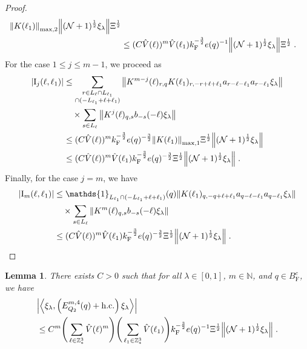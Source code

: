 \documentclass[12pt,a4paper]{article}
\numberwithin{equation}{section}
\newcommand{\NNN}{\mathbb{N}}
\newcommand{\1}{\mathbb{I}}
\newcommand{\F}{\mathrm{F}}
\newcommand{\I}{\mathrm{I}}
\newcommand{\Z}{\mathbb{Z}}
\newcommand{\NN}{\mathcal{N}}
\newcommand{\half}{\frac{1}{2}}
\newcommand{\eva}[1]{\left\langle #1 \right\rangle}
\theoremstyle{plain}
\newtheorem{lemma}[theorem]{Lemma}
\theoremstyle{definition}
\theoremstyle{remark}
\theoremstyle{plain}
\theoremstyle{definition}
\theoremstyle{remark}
\begin{document}
\begin{proof}
\begin{align}
		\norm{K(\ell_1)}_{\max,2} \norm{ (\NN+1)^\half \xi_\lambda } \Xi^{\half} \nonumber\\
	&\leq (C \hat{V}(\ell))^m
		\hat{V}(\ell_1)
		k_{\F}^{-\frac 32} e(q)^{-1}
		\norm{ (\NN+1)^\half \xi_\lambda } \Xi^{\half} \;. \label{eq:estEQ2151}
\end{align}
For the case $ 1 \le j \le m-1 $, we proceed as
\begin{align}
	|\I_j(\ell, \ell_1)|
	&\leq \sum_{\substack{r\in L_{\ell} \cap L_{\ell_1}\\ \cap (-L_{\ell_1}+\ell+\ell_1)}}
		\norm{ K^{m-j}(\ell)_{r,q} K(\ell_1)_{r,-r+\ell+\ell_1} a_{r-\ell-\ell_1} a_{r-\ell_1} \xi_\lambda} \\
		& \quad \times
		\sum_{s \in L_{\ell}}
		\norm{ K^j(\ell)_{q,s} b_{-s}(-\ell) \xi_\lambda }\nonumber\\
	&\leq (C \hat{V}(\ell))^m k_{\F}^{-\frac 32} e(q)^{-\frac 32}
		\norm{K(\ell_1)}_{\max,1} \Xi^{\half}
		\norm{ (\NN+1)^\half \xi_\lambda} \nonumber\\
	&\leq (C \hat{V}(\ell))^m
		\hat{V}(\ell_1)
		k_{\F}^{-\frac 32} e(q)^{-\frac 32} \Xi^\half
		\norm{ (\NN+1)^\half \xi_\lambda} \;. \label{eq:estEQ2152}
\end{align}
Finally, for the case $ j = m $, we have
\begin{align}
	|\I_m(\ell, \ell_1)|
	&\leq \mathds{1}_{L_{\ell_1} \cap (-L_{\ell_1} + \ell + \ell_1)}(q) \norm{K(\ell_1)_{q,-q+\ell+\ell_1} a_{q-\ell-\ell_1} a_{q-\ell_1} \xi_\lambda}  \label{eq:estEQ2153} \\
	& \quad \times
		\sum_{ s \in L_{\ell}}
		\norm{ K^m(\ell)_{q,s} b_{-s}(-\ell) \xi_\lambda }\nonumber\\
	&\leq (C \hat{V}(\ell))^m
		\hat{V}(\ell_1)
		k_{\F}^{-\frac 32} e(q)^{-\frac 32} \Xi^\half
		\norm{(\NN+1)^\half\xi_\lambda} \;. \qedhere \nonumber
\end{align}
\end{proof}


\begin{lemma} \label{lem:EQ217}
There exists $ C > 0 $ such that for all $ \lambda \in [0,1] $, $ m \in \NNN $, and $ q \in B_{\F}^c $, we have
\begin{align}\label{eq:estEQ217}
\begin{split}
	& \abs{\eva{\xi_\lambda,\left(E^{m,4}_{Q_2}(q) + \mathrm{h.c.}\right) \xi_\lambda }} \\
	&\leq C^m \Bigg(\sum_{\ell\in \Z^3_*} \hat{V}(\ell)^m \Bigg)
		\Bigg(\sum_{\ell_1\in \Z^3_*} \hat{V}(\ell_1) \Bigg)
		k_{\F}^{-\frac{3}{2}} e(q)^{-1} \Xi^{\half} 
		\norm{(\NN+1)^\half \xi_\lambda } \;.
\end{split}
\end{align}
\end{lemma}
\end{document}
